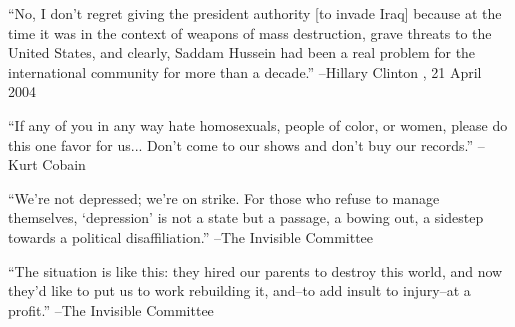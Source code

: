 \documentclass{article}%
\begin{document}
\linebreak%
\vspace{1mm}%
\begin{minipage}{\textwidth}%
\flushleft%
“No, I don't regret giving the president authority {[}to invade Iraq{]} because at the time it was in the context of weapons of mass destruction, grave threats to the United States, and clearly, Saddam Hussein had been a real problem for the international community for more than a decade.”%
\linebreak%
\vspace{1mm}%
–Hillary Clinton%
, 21 April 2004%
\linebreak%
\vspace{1mm}%
\end{minipage}%
\linebreak%
\vspace{1mm}%
\begin{minipage}{\textwidth}%
\flushleft%
“If any of you in any way hate homosexuals, people of color, or women, please do this one favor for us... Don't come to our shows and don't buy our records.”%
\linebreak%
\vspace{1mm}%
–Kurt Cobain%
\linebreak%
\vspace{1mm}%
\end{minipage}%
\linebreak%
\vspace{1mm}%
\begin{minipage}{\textwidth}%
\flushleft%
“We're not depressed; we're on strike. For those who refuse to manage themselves, ‘depression’ is not a state but a passage, a bowing out, a sidestep towards a political disaffiliation.”%
\linebreak%
\vspace{1mm}%
–The Invisible Committee%
\linebreak%
\vspace{1mm}%
\end{minipage}%
\linebreak%
\vspace{1mm}%
\begin{minipage}{\textwidth}%
\flushleft%
“The situation is like this: they hired our parents to destroy this world, and now they'd like to put us to work rebuilding it, and–to add insult to injury–at  a profit.”%
\linebreak%
\vspace{1mm}%
–The Invisible Committee%
\linebreak%
\vspace{1mm}%
\end{minipage}%
\end{document}
